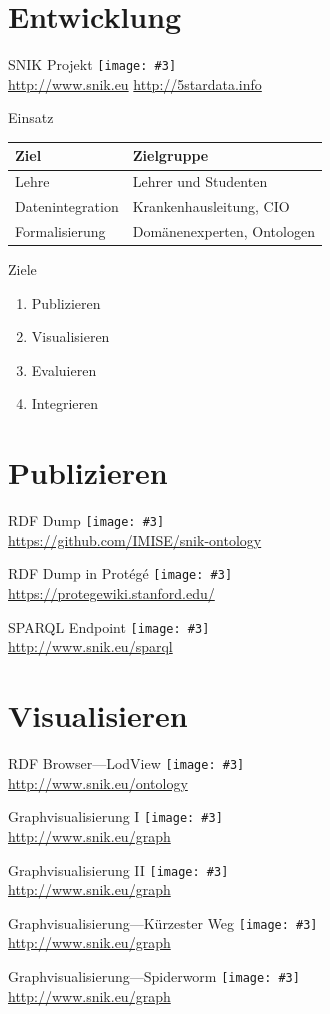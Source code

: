 \documentclass{beamer}
\newcommand{\imageslide}[3][]
{
\begin{frame}{#2}
\centering\texttt{[image: \#3]}
\\#1
\end{frame}
}
\begin{document}
\section{Entwicklung}

\imageslide[\url{http://www.snik.eu} \url{http://5stardata.info}]{SNIK Projekt}{../sniktec/img/5star.png}

\begin{frame}{Einsatz}
\centering
\begin{tabular}{ll}
\toprule
\textbf{Ziel}	&\textbf{Zielgruppe}\\
\midrule
Lehre			&Lehrer und Studenten\\ 
Datenintegration	&Krankenhausleitung, CIO\\
Formalisierung		&Domänenexperten, Ontologen\\
\bottomrule
\end{tabular}
\end{frame}

\begin{frame}{Ziele}
\begin{enumerate}
\item Publizieren 
\item Visualisieren 
\item Evaluieren
\item Integrieren 
\end{enumerate}
\end{frame}

\section{Publizieren}

\imageslide[\url{https://github.com/IMISE/snik-ontology}]{RDF Dump}{../sniktec/img/rdfdump.png}
\imageslide[\url{https://protegewiki.stanford.edu/}]{RDF Dump in Protégé}{../sniktec/img/protege.png}
\imageslide[\url{http://www.snik.eu/sparql}]{SPARQL Endpoint}{../sniktec/img/sparqlresult.png}

\section{Visualisieren}

\imageslide[\url{http://www.snik.eu/ontology}]{RDF Browser---LodView}{../sniktec/img/browse-cio.png}

\imageslide[\url{http://www.snik.eu/graph}]{Graphvisualisierung I}{../sniktec/img/graph-entitytype.png}
\imageslide[\url{http://www.snik.eu/graph}]{Graphvisualisierung II}{../sniktec/img/graph-erf.png}
\imageslide[\url{http://www.snik.eu/graph}]{Graphvisualisierung---Kürzester Weg}{../sniktec/img/shortestpath.png}
\imageslide[\url{http://www.snik.eu/graph}]{Graphvisualisierung---Spiderworm}{../sniktec/img/spiderworm.png}
\end{document}
